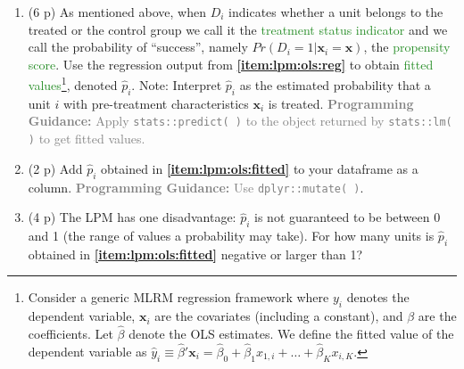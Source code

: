 \documentclass{article}
\begin{document}
\begin{enumerate}[label=\textbf{Q\arabic{enumi}}.,ref=Q\arabic{enumi}, wide=0pt, itemsep=0em, topsep=5pt, labelindent=0pt]
\begin{enumerate}
\begin{enumerate}
\end{enumerate}
\item (6 p) As mentioned above, when $D_i$ indicates whether a unit belongs to the treated or the control group we call it the \textcolor{ForestGreen}{treatment status indicator} and we call the probability of ``success'', namely $Pr(D_i=1|\mathbf{x}_i=\mathbf{x})$, the \textcolor{ForestGreen}{propensity score}. Use the regression output from \textbf{\ref{item:lpm:ols:reg}} to obtain \textcolor{ForestGreen}{fitted values}\footnote{Consider a generic MLRM regression framework where $y_i$ denotes the dependent variable, $\mathbf{x}_i$ are the covariates (including a constant), and $\beta$ are the coefficients. Let $\hat{\beta}$ denote the OLS estimates. We define the fitted value of the dependent variable as $\hat{y}_i \equiv \hat{\beta}'\mathbf{x}_i = \hat{\beta}_0 + \hat{\beta}_1 x_{1,i}+\ldots+\hat{\beta}_K x_{i,K}$.}, denoted $\hat{p}_i$. Note: Interpret $\hat{p}_i$ as the estimated probability that a unit $i$ with pre-treatment characteristics $\mathbf{x}_i$ is treated. \textcolor{gray}{\textbf{Programming Guidance:} Apply \texttt{stats::predict( )} to the object returned by \texttt{stats::lm( )} to get fitted values.}\label{item:lpm:ols:fitted}
\item (2 p) Add $\hat{p}_i$ obtained in \textbf{\ref{item:lpm:ols:fitted}} to your dataframe as a column. \textcolor{gray}{\textbf{Programming Guidance:} Use \texttt{dplyr::mutate( )}}.
\item (4 p) The LPM has one disadvantage: $\hat{p}_i$ is not guaranteed to be between 0 and 1 (the range of values a probability may take). For how many units is $\hat{p}_i$ obtained in \textbf{\ref{item:lpm:ols:fitted}} negative or larger than 1?
\end{enumerate}


\end{enumerate}
\end{document}
